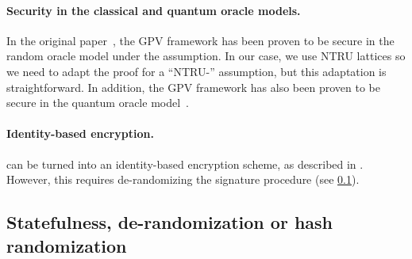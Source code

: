 

\paragraph{Security in the classical and quantum oracle models.}
In the original paper~\cite{STOC:GenPeiVai08}, the GPV framework has been proven to be secure in the random oracle model under the \sis assumption. In our case, we use NTRU lattices so we need to adapt the proof for a ``NTRU-\sis'' assumption, but this adaptation is straightforward. In addition, the GPV framework has also been proven to be secure in the quantum oracle model~\cite{AC:BDFLSZ11}.

\paragraph{Identity-based encryption.}

\falcon can be turned into an identity-based encryption scheme, as described in \cite{AC:DucLyuPre14}. However, this requires de-randomizing the signature procedure (see \cref{sec:ratio:randomization}).

\subsection{Statefulness, de-randomization or hash randomization}\label{sec:ratio:randomization}

